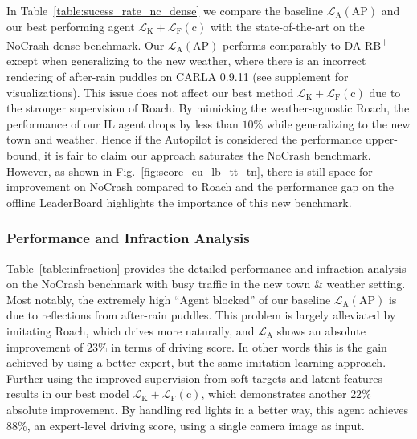 In Table~\ref{table:sucess_rate_nc_dense} we compare the baseline $\mathcal{L}_\text{A}(\text{AP})$ and our best performing agent $\mathcal{L}_\text{K}+\mathcal{L}_\text{F}(\text{c})$ with the state-of-the-art on the NoCrash-dense benchmark.
Our $\mathcal{L}_\text{A}(\text{AP})$ performs comparably to DA-RB\textsuperscript{+} except when generalizing to the new weather, where there is an incorrect rendering of after-rain puddles on CARLA 0.9.11 (see supplement for visualizations).
This issue does not affect our best method $\mathcal{L}_\text{K}+\mathcal{L}_\text{F}(\text{c})$ due to the stronger supervision of Roach. 
By mimicking the weather-agnostic Roach, the performance of our IL agent drops by less than $10\%$ while generalizing to the new town and weather.
Hence if the Autopilot is considered the performance upper-bound, it is fair to claim our approach saturates the NoCrash benchmark.
However, as shown in Fig.~\ref{fig:score_eu_lb_tt_tn}, there is still space for improvement on NoCrash compared to Roach and the performance gap on the offline LeaderBoard highlights the importance of this new benchmark.


\subsubsection{Performance and Infraction Analysis}

Table~\ref{table:infraction} provides the detailed performance and infraction analysis on the NoCrash benchmark with busy traffic in the new town \& weather setting.
Most notably, the extremely high ``Agent blocked'' of our baseline $\mathcal{L}_\text{A}(\text{AP})$ is due to reflections from after-rain puddles.
This problem is largely alleviated by imitating Roach, which drives more naturally, and $\mathcal{L}_\text{A}$ shows an absolute improvement of $23\%$ in terms of driving score.
In other words this is the gain achieved by using a better expert, but the same imitation learning approach. 
Further using the improved supervision from soft targets and latent features results in our best model $\mathcal{L}_\text{K}+\mathcal{L}_\text{F}(\text{c})$, which demonstrates another $22\%$ absolute improvement.
By handling red lights in a better way, this agent achieves $88\%$, an expert-level driving score, using a single camera image as input.



 